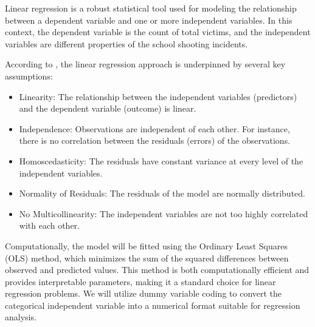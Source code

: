 \documentclass[12pt]{article}
\numberwithin{figure}{section}
\begin{document}
Linear regression is a robust statistical tool used for modeling the relationship between a dependent variable and one or more independent variables. In this context, the dependent variable is the count of total victims, and the independent variables are different properties of the school shooting incidents.

According to \textcite{slides_lm}, the linear regression approach is underpinned by several key assumptions:

\begin{itemize}
    \item Linearity: The relationship between the independent variables (predictors) and the dependent variable (outcome) is linear.
    \item Independence: Observations are independent of each other. For instance, there is no correlation between the residuals (errors) of the observations.
    \item Homoscedasticity: The residuals have constant variance at every level of the independent variables. 
    \item Normality of Residuals: The residuals of the model are normally distributed. 
    \item No Multicollinearity: The independent variables are not too highly correlated with each other.
\end{itemize}

Computationally, the model will be fitted using the Ordinary Least Squares (OLS) method, which minimizes the sum of the squared differences between observed and predicted values. This method is both computationally efficient and provides interpretable parameters, making it a standard choice for linear regression problems. We will utilize dummy variable coding to convert the categorical independent variable into a numerical format suitable for regression analysis.

\end{document}
